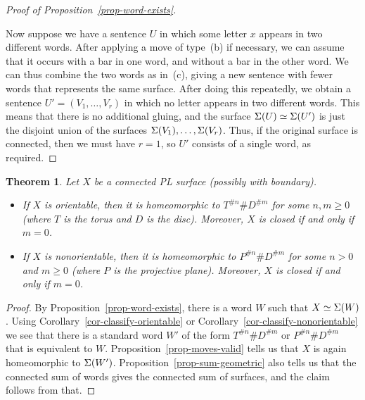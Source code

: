 \documentclass[reqno]{amsart}
\newtheorem{theorem}{Theorem}[section]
\theoremstyle{definition}
\begin{document}
\begin{proof}[Proof of Proposition~\ref{prop-word-exists}]
\begin{center}
 \end{center}
 Now suppose we have a sentence $U$ in which some letter $x$ appears in
 two different words.  After applying a move of type~(b) if necessary,
 we can assume that it occurs with a bar in one word, and without a
 bar in the other word.  We can thus combine the two words as in~(c),
 giving a new sentence with fewer words that represents the same
 surface.  After doing this repeatedly, we obtain a sentence
 $U'=(V_1,\dotsc,V_r)$ in which no letter appears in two different
 words.  This means that there is no additional gluing, and the
 surface $\Sigma(U)\simeq\Sigma(U')$ is just the disjoint union of the
 surfaces $\Sigma(V_1),\dotsc,\Sigma(V_r)$.  Thus, if the original surface
 is connected, then we must have $r=1$, so $U'$ consists of a single
 word, as required.
\end{proof}

\begin{theorem}\label{thm-classify}
 Let $X$ be a connected PL surface (possibly with boundary).
 \begin{itemize}
  \item[(a)] If $X$ is orientable, then it is homeomorphic to
   $T^{\# n}\#D^{\# m}$ for some $n,m\geq 0$ (where $T$ is the torus
   and $D$ is the disc).  Moreover, $X$ is closed if and only if $m=0$.
  \item[(b)] If $X$ is nonorientable, then it is homeomorphic to
   $P^{\# n}\#D^{\# m}$ for some $n>0$ and $m\geq 0$ (where $P$ is the
   projective plane).  Moreover, $X$ is closed if and only if $m=0$.
 \end{itemize}
\end{theorem}
\begin{proof}
 By Proposition~\ref{prop-word-exists}, there is a word $W$ such that
 $X\simeq\Sigma(W)$.  Using Corollary~\ref{cor-classify-orientable} or
 Corollary~\ref{cor-classify-nonorientable} we see that there is a
 standard word $W'$ of the form $T^{\# n}\# D^{\# m}$ or
 $P^{\# n}\# D^{\# m}$ that is equivalent to $W$.
 Proposition~\ref{prop-moves-valid} tells us that $X$ is again
 homeomorphic to $\Sigma(W')$.  Proposition~\ref{prop-sum-geometric} also
 tells us that the connected sum of words gives the connected sum of
 surfaces, and the claim follows from that.
\end{proof}
\end{document}
